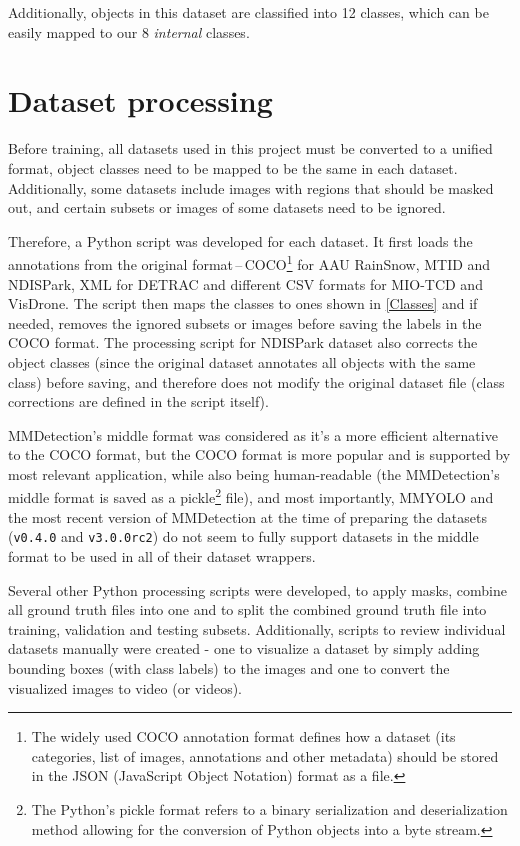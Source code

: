 Additionally, objects in this dataset are classified into 12 classes, which can
be easily mapped to our 8 \textit{internal} classes.


\section{Dataset processing}

Before training, all datasets used in this project must be converted to a
unified format, object classes need to be mapped to be the same in each dataset.
Additionally, some datasets include images with regions that should be masked
out, and certain subsets or images of some datasets need to be ignored.

Therefore, a Python script was developed for each dataset. It first loads the
annotations from the original format\,--\,COCO\footnote{The widely used COCO
annotation format defines how a dataset (its categories, list of images,
annotations and other metadata) should be stored in the JSON (JavaScript Object
Notation) format as a file.} for AAU RainSnow, MTID
and NDISPark, XML for DETRAC and different CSV formats for MIO-TCD and VisDrone.
The script then maps the classes to ones shown in \autoref{Classes} and if
needed, removes the ignored subsets or images before saving the labels in the
COCO format. The processing script for NDISPark dataset also corrects the object
classes (since the original dataset annotates all objects with the same class)
before saving, and therefore does not modify the original dataset file (class
corrections are defined in the script itself).

MMDetection's middle format was considered as it's a more efficient alternative
to the COCO format, but the COCO format is more popular and is supported by most
relevant application, while also being human-readable (the MMDetection's middle
format is saved as a pickle\footnote{The Python's pickle format refers to a
binary serialization and deserialization method allowing for the conversion of
Python objects into a byte stream.} file), and most importantly, MMYOLO and the
most recent version of MMDetection at the time of preparing the datasets
(\texttt{v0.4.0} and \texttt{v3.0.0rc2}) do not seem to fully support datasets
in the middle format to be used in all of their dataset wrappers.

Several other Python processing scripts were developed, to apply masks, combine
all ground truth files into one and to split the combined ground truth file into
training, validation and testing subsets. Additionally, scripts to review
individual datasets manually were created - one to visualize a dataset by simply
adding bounding boxes (with class labels) to the images and one to convert the
visualized images to video (or videos).

